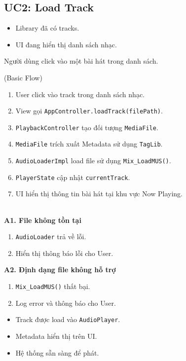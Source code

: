 \newpage
\subsection{UC2: Load Track}

\begin{description}[style=multiline, leftmargin=3cm, font=\bfseries]
    \item[Pre-conditions] 
    \begin{itemize}
        \item Library đã có tracks.
        \item UI đang hiển thị danh sách nhạc.
    \end{itemize}

    \item[Trigger] Người dùng click vào một bài hát trong danh sách.

    \item[Main Success Scenario] (Basic Flow)
    \begin{enumerate}
        \item User click vào track trong danh sách nhạc.
        \item View gọi \texttt{AppController.loadTrack(filePath)}.
        \item \texttt{PlaybackController} tạo đối tượng \texttt{MediaFile}.
        \item \texttt{MediaFile} trích xuất Metadata sử dụng \texttt{TagLib}.
        \item \texttt{AudioLoaderImpl} load file sử dụng \texttt{Mix\_LoadMUS()}.
        \item \texttt{PlayerState} cập nhật \texttt{currentTrack}.
        \item UI hiển thị thông tin bài hát tại khu vực Now Playing.
    \end{enumerate}

    \item[Alternative Flows] \hfill \\
    \textbf{A1. File không tồn tại}
    \begin{enumerate}
        \item \texttt{AudioLoader} trả về lỗi.
        \item Hiển thị thông báo lỗi cho User.
    \end{enumerate}
    \textbf{A2. Định dạng file không hỗ trợ}
    \begin{enumerate}
        \item \texttt{Mix\_LoadMUS()} thất bại.
        \item Log error và thông báo cho User.
    \end{enumerate}

    \item[Post-conditions] 
    \begin{itemize}
        \item Track được load vào \texttt{AudioPlayer}.
        \item Metadata hiển thị trên UI.
        \item Hệ thống sẵn sàng để phát.
    \end{itemize}
\end{description}

